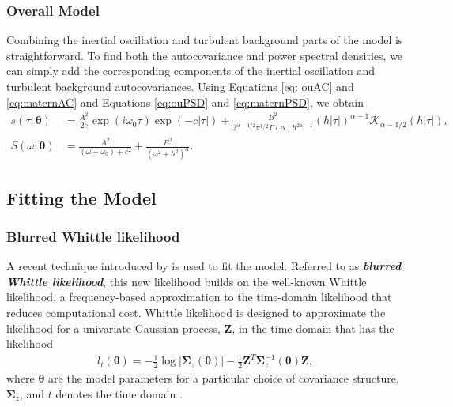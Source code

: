 \documentclass{stat572Style}
\begin{document}
\subsubsection{Overall Model}
Combining the inertial oscillation and turbulent background parts of the model is straightforward.
 To find both the autocovariance and power spectral densities, we can simply add the corresponding components of the inertial oscillation and turbulent background autocovariances. 
 Using Equations \eqref{eq: ouAC} and \eqref{eq:maternAC} and Equations \eqref{eq:ouPSD} and \eqref{eq:maternPSD}, we obtain
\begin{align}
\label{eq: fullSpec}
s(\tau ;\boldsymbol{\theta}) &= \frac{A^{2}}{2c} \exp(i \omega_{0}\tau) \exp(-c|\tau|) +  \frac{B^{2}}{2^{\alpha - 1/2}\pi^{1/2} \Gamma(\alpha) h^{2 \alpha - 1}}(h|\tau|)^{\alpha - 1}\mathcal{K}_{\alpha - 1/2}(h|\tau|)
,\\
S(\omega; \boldsymbol{\theta}) &= \frac{A^{2}}{(\omega - \omega_{0}) + c^{2}} + \frac{B^{2}}{(\omega^{2} + h^{2})^{\alpha}}.
\end{align}



\subsection{Fitting the Model}
\subsubsection{Blurred Whittle likelihood}
\par A recent technique introduced by \citet{Sykulski2013}  is used to fit the model.
 Referred to as \textbf{\it{blurred Whittle likelihood}}, this new likelihood builds on the well-known Whittle likelihood, a frequency-based approximation  to the time-domain likelihood that reduces computational cost. 
  Whittle likelihood is designed to approximate the likelihood for a univariate Gaussian process, $\boldsymbol{Z}$,  in the time domain that has the likelihood
\begin{align*}
l_{t}(\boldsymbol{\theta}) = - \frac{1}{2} \log \left|\boldsymbol{\Sigma}_{z}(\boldsymbol{\theta}) \right| - \frac{1}{2} \boldsymbol{Z}^{T} \boldsymbol{\Sigma}_{z}^{-1}(\boldsymbol{\theta})\boldsymbol{Z},
\end{align*}
where $\boldsymbol{\theta}$ are the model parameters for a particular choice of covariance structure, $\boldsymbol{\Sigma}_{z}$,  and $t$ denotes the time domain  \citep{Sykulski2013}. 
\end{document}
